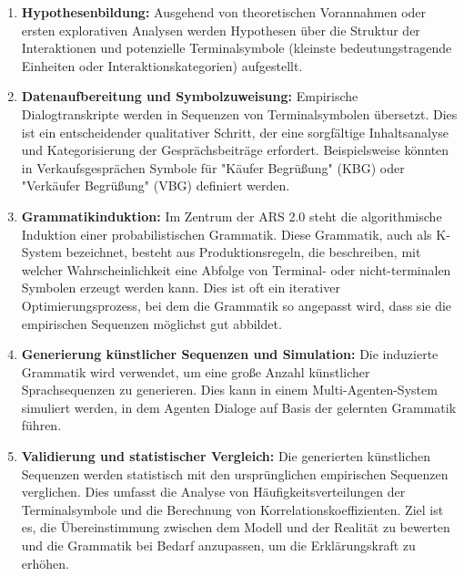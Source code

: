 \documentclass{article}
\begin{document}
\begin{enumerate}
    \item \textbf{Hypothesenbildung:} Ausgehend von theoretischen Vorannahmen oder ersten explorativen Analysen werden Hypothesen über die Struktur der Interaktionen und potenzielle Terminalsymbole (kleinste bedeutungstragende Einheiten oder Interaktionskategorien) aufgestellt.
    \item \textbf{Datenaufbereitung und Symbolzuweisung:} Empirische Dialogtranskripte werden in Sequenzen von Terminalsymbolen übersetzt. Dies ist ein entscheidender qualitativer Schritt, der eine sorgfältige Inhaltsanalyse und Kategorisierung der Gesprächsbeiträge erfordert. Beispielsweise könnten in Verkaufsgesprächen Symbole für "Käufer Begrüßung" (KBG) oder "Verkäufer Begrüßung" (VBG) definiert werden.
    \item \textbf{Grammatikinduktion:} Im Zentrum der ARS 2.0 steht die algorithmische Induktion einer probabilistischen Grammatik. Diese Grammatik, auch als K-System bezeichnet, besteht aus Produktionsregeln, die beschreiben, mit welcher Wahrscheinlichkeit eine Abfolge von Terminal- oder nicht-terminalen Symbolen erzeugt werden kann. Dies ist oft ein iterativer Optimierungsprozess, bei dem die Grammatik so angepasst wird, dass sie die empirischen Sequenzen möglichst gut abbildet.
    \item \textbf{Generierung künstlicher Sequenzen und Simulation:} Die induzierte Grammatik wird verwendet, um eine große Anzahl künstlicher Sprachsequenzen zu generieren. Dies kann in einem Multi-Agenten-System simuliert werden, in dem Agenten Dialoge auf Basis der gelernten Grammatik führen.
    \item \textbf{Validierung und statistischer Vergleich:} Die generierten künstlichen Sequenzen werden statistisch mit den ursprünglichen empirischen Sequenzen verglichen. Dies umfasst die Analyse von Häufigkeitsverteilungen der Terminalsymbole und die Berechnung von Korrelationskoeffizienten. Ziel ist es, die Übereinstimmung zwischen dem Modell und der Realität zu bewerten und die Grammatik bei Bedarf anzupassen, um die Erklärungskraft zu erhöhen.
\end{enumerate}
\end{document}
